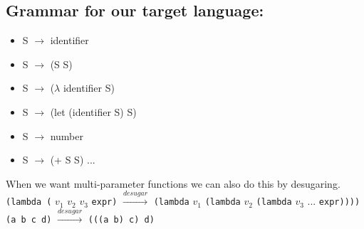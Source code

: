 \documentclass{article}
\begin{document}
\begin{flushleft}
\subsection*{Grammar for our target language:}
\begin{itemize}
 \item[] S $\rightarrow$ identifier
 \item[] S $\rightarrow$ (S S)
 \item[] S $\rightarrow$ ($\lambda$ identifier S)
 \item[] S $\rightarrow$ (let (identifier S) S)
 \item[] S $\rightarrow$ number
 \item[] S $\rightarrow$ (+ S S) ...
\end{itemize}
When we want multi-parameter functions we can also do this by desugaring.\\
\bigskip
\verb|(lambda (| $v_1$ $v_2$ $v_3$ \verb|expr)| $\xrightarrow{desugar}$ \verb|(lambda| $v_1$ \verb|(lambda| $v_2$ \verb|(lambda| $v_3$ ... \verb|expr))))|\\
\bigskip
\verb|(a b c d)| $\xrightarrow{desugar}$ \verb|(((a b) c) d)|
\end{flushleft}
\end{document}
